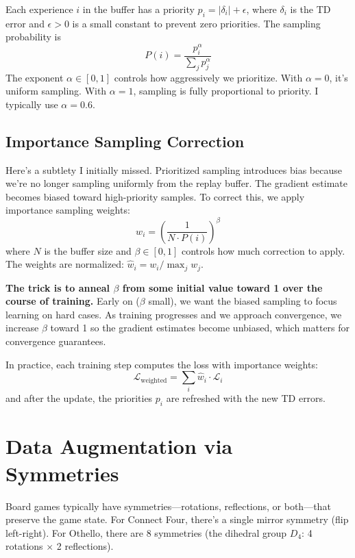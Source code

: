 \documentclass[11pt]{article}
\begin{document}
Each experience $i$ in the buffer has a priority $p_i = |\delta_i| + \epsilon$, where $\delta_i$ is the TD error and $\epsilon > 0$ is a small constant to prevent zero priorities. The sampling probability is
\begin{equation}
P(i) = \frac{p_i^\alpha}{\sum_j p_j^\alpha}
\end{equation}
The exponent $\alpha \in [0,1]$ controls how aggressively we prioritize. With $\alpha = 0$, it's uniform sampling. With $\alpha = 1$, sampling is fully proportional to priority. I typically use $\alpha = 0.6$.

\subsection{Importance Sampling Correction}

Here's a subtlety I initially missed. Prioritized sampling introduces bias because we're no longer sampling uniformly from the replay buffer. The gradient estimate becomes biased toward high-priority samples. To correct this, we apply importance sampling weights:
\begin{equation}
w_i = \left(\frac{1}{N \cdot P(i)}\right)^\beta
\end{equation}
where $N$ is the buffer size and $\beta \in [0,1]$ controls how much correction to apply. The weights are normalized: $\hat{w}_i = w_i / \max_j w_j$.

\textbf{The trick is to anneal $\beta$ from some initial value toward 1 over the course of training.} Early on ($\beta$ small), we want the biased sampling to focus learning on hard cases. As training progresses and we approach convergence, we increase $\beta$ toward 1 so the gradient estimates become unbiased, which matters for convergence guarantees.

In practice, each training step computes the loss with importance weights:
\[
\mathcal{L}_{\text{weighted}} = \sum_i \hat{w}_i \cdot \mathcal{L}_i
\]
and after the update, the priorities $p_i$ are refreshed with the new TD errors.

\section{Data Augmentation via Symmetries}

Board games typically have symmetries---rotations, reflections, or both---that preserve the game state. For Connect Four, there's a single mirror symmetry (flip left-right). For Othello, there are 8 symmetries (the dihedral group $D_4$: 4 rotations $\times$ 2 reflections).
\end{document}
